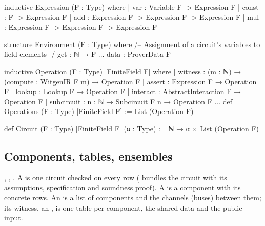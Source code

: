 

\begin{leancode}
inductive Expression (F : Type) where
  | var : Variable F -> Expression F
  | const : F -> Expression F
  | add : Expression F -> Expression F -> Expression F
  | mul : Expression F -> Expression F -> Expression F
\end{leancode}



\begin{leancode}
structure Environment (F : Type) where
  /-- Assignment of a circuit's variables to field elements -/
  get : ℕ → F
  ...
  data : ProverData F
\end{leancode}



\begin{leancode}
inductive Operation (F : Type) [FiniteField F] where
  | witness : (m : ℕ) → (compute : WitgenIR F m) → Operation F
  | assert : Expression F → Operation F
  | lookup : Lookup F → Operation F
  | interact : AbstractInteraction F → Operation F
  | subcircuit : {n : ℕ} → Subcircuit F n → Operation F
...
def Operations (F : Type) [FiniteField F] := List (Operation F)
\end{leancode}



\begin{leancode}
def Circuit (F : Type) [FiniteField F] (α : Type) := ℕ → α × List (Operation F)
\end{leancode}


\subsection{Components, tables, ensembles}\label{sec:gen-lib-clean-tables}

\begin{define}{, , , }
A  is one circuit checked on every row ( bundles the
circuit with its assumptions, specification and soundness proof). A  is a component
with its concrete rows. An  is a list of components and the channels (buses)
between them; its witness, an , is one table per component, the shared
data and the public input.
\end{define}

